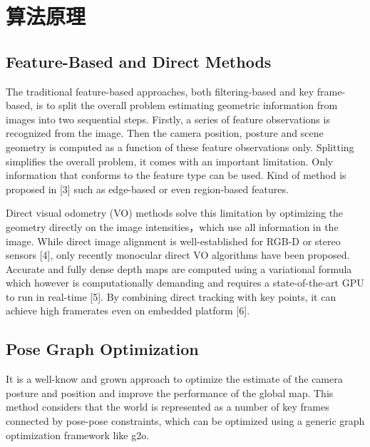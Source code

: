 
\chapter{算法原理}
\label{chap:PRINCIPLE}


\section{Feature-Based and Direct Methods}
The traditional feature-based approaches, both filtering-based and key frame-based, is to split the overall problem estimating geometric information from images into two sequential steps. Firstly, a series of feature observations is recognized from the image. Then the camera position, posture and scene geometry is computed as a function of these feature observations only. Splitting simplifies the overall problem, it comes with an important limitation. Only information that conforms to the feature type can be used. Kind of method is proposed in [3] such as edge-based or even region-based features.

Direct visual odometry (VO) methods solve this limitation by optimizing the geometry directly on the image intensities，which use all information in the image. While direct image alignment is well-established for RGB-D or stereo sensors [4], only recently monocular direct VO algorithms have been proposed. Accurate and fully dense depth maps are computed using a variational formula which however is computationally demanding and requires a state-of-the-art GPU to run in real-time [5]. By combining direct tracking with key points, it can achieve high framerates even on embedded platform [6].


\section{Pose Graph Optimization}
It is a well-know and grown approach to optimize the estimate of the camera posture and position and improve the performance of the global map. This method considers that the world is represented as a number of key frames connected by pose-pose constraints, which can be optimized using a generic graph optimization framework like g2o.


